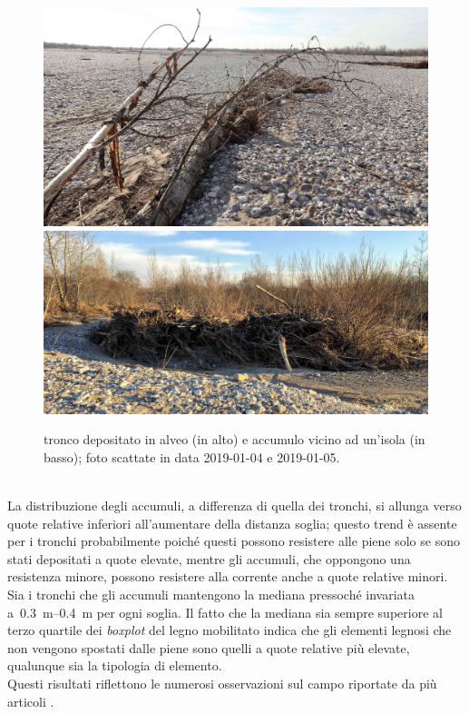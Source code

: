 %
\begin{figure}
	\centering
	\includegraphics[width = \textwidth]{files/tronco.jpeg}
	\\[0.1cm]
	\includegraphics[width = \textwidth]{files/accumulo.jpeg}
	\caption[tronco depositato in alveo e accumulo vicino ad un'isola]{tronco depositato in alveo (in alto) e accumulo vicino ad un'isola (in basso); foto scattate in data 2019-01-04 e 2019-01-05.}
	\label{fig:tronco-vs-accumulo}
\end{figure}
%
\\
La distribuzione degli accumuli, a differenza di quella dei tronchi, si allunga verso quote relative inferiori all'aumentare della distanza soglia; questo trend è assente per i tronchi probabilmente poiché questi possono resistere alle piene solo se sono stati depositati a quote elevate, mentre gli accumuli, che oppongono una resistenza minore, possono resistere alla corrente anche a quote relative minori.
\\
Sia i tronchi che gli accumuli mantengono la mediana pressoché invariata a~\SIrange[range-phrase = {-}, range-units = single]{0.3}{0.4}{\m} per ogni soglia.
Il fatto che la mediana sia sempre superiore al terzo quartile dei \emph{boxplot} del legno mobilitato indica che gli elementi legnosi che non vengono spostati dalle piene sono quelli a quote relative più elevate, qualunque sia la tipologia di elemento.
\\
Questi risultati riflettono le numerosi osservazioni sul campo riportate da più articoli .

